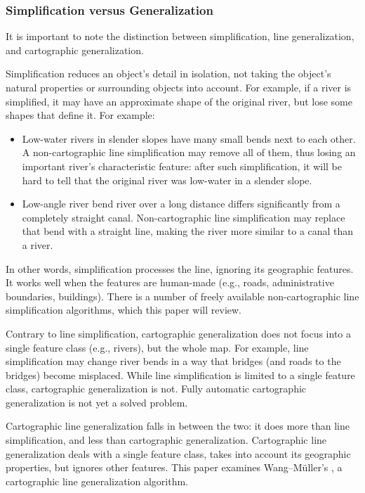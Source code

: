 \documentclass[a4paper]{article}
\newcommand{\titlecite}[1]{\citetitle{#1}\cite{#1}}
\newcommand{\WM}{Wang--M{\"u}ller}
\begin{document}
\subsubsection{Simplification versus Generalization}

It is important to note the distinction between simplification, line
generalization, and cartographic generalization.

Simplification reduces an object's detail in isolation, not taking the object's
natural properties or surrounding objects into account. For example, if a
river is simplified, it may have an approximate shape of the original river,
but lose some shapes that define it. For example:

\begin{itemize}

  \item Low-water rivers in slender slopes have many small bends next to each
      other. A non-cartographic line simplification may remove all of them,
        thus losing an important river's characteristic feature: after such
        simplification, it will be hard to tell that the original river was
        low-water in a slender slope.

  \item Low-angle river bend river over a long distance differs significantly
      from a completely straight canal. Non-cartographic line simplification
        may replace that bend with a straight line, making the river more
        similar to a canal than a river.

\end{itemize}

In other words, simplification processes the line, ignoring its geographic
features. It works well when the features are human-made (e.g., roads,
administrative boundaries, buildings). There is a number of freely available
non-cartographic line simplification algorithms, which this paper will review.

Contrary to line simplification, cartographic generalization does not focus
into a single feature class (e.g., rivers), but the whole map. For example,
line simplification may change river bends in a way that bridges (and roads to
the bridges) become misplaced. While line simplification is limited to a single
feature class, cartographic generalization is not. Fully automatic cartographic
generalization is not yet a solved problem. %

Cartographic line generalization falls in between the two: it does more than
line simplification, and less than cartographic generalization. Cartographic
line generalization deals with a single feature class, takes into account its
geographic properties, but ignores other features. This paper examines {\WM}'s
\titlecite{wang1998line}, a cartographic line generalization algorithm.
\end{document}
